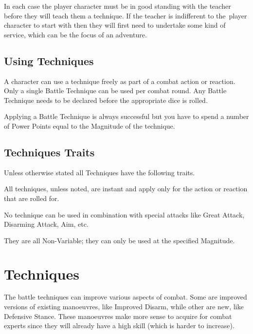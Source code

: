 In each case the player character must be in good standing with the teacher before they will teach them a technique. If the teacher is indifferent to the player character to start with then they will first need to undertake some kind of service, which can be the focus of an adventure.

\subsection{Using Techniques}
A character can use a technique freely as part of a combat action or reaction. Only a single Battle Technique can be used per combat round. Any Battle Technique needs to be declared before the appropriate dice is rolled.

Applying a Battle Technique is always successful but you have to spend a number of Power Points equal to the Magnitude of the technique.


\subsection{Techniques Traits}
Unless otherwise stated all Techniques have the following traits.

\begin{rpg-list}
\item All techniques, unless noted, are instant and apply only for the action or reaction that are rolled for.
\item No technique can be used in combination with special attacks like Great Attack, Disarming Attack, Aim, etc.
\item They are all Non-Variable; they can only be used at the specified Magnitude.
\end{rpg-list}


\section{Techniques}
The battle techniques can improve various aspects of combat. Some are improved versions of existing manoeuvres, like Improved Disarm, while other are new, like Defensive Stance. These manoeuvres make more sense to acquire for combat experts since they will already have a high skill (which is harder to increase).


